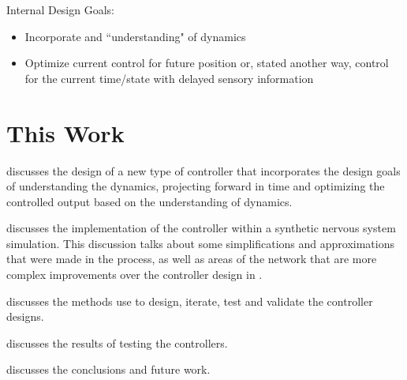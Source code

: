 Internal Design Goals:
\begin{itemize}
\item Incorporate and ``understanding" of dynamics
\item Optimize current control for future position or, stated another way,
control for the current time/state with delayed sensory information
\end{itemize}

\section{This Work}

discusses the design of a new type 
of controller that incorporates the
design goals of understanding the dynamics, projecting forward in time and
optimizing the controlled output based on the understanding of dynamics.

 discusses the implementation of the controller within 
a synthetic nervous system
simulation. This discussion talks about some simplifications and approximations
that were made in the process, as well as areas of the network that are more
complex improvements over the controller design in .

 discusses the methods use to design, iterate, test and
validate the controller designs.

 discusses the results of testing the controllers.

 discusses the conclusions and future work.
